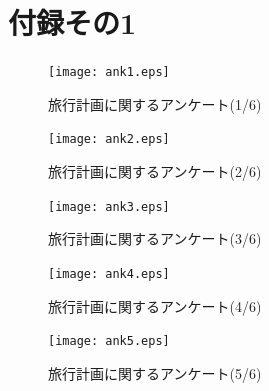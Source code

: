 \documentclass{funthesis}
\begin{document}


\chapter*{付録その1}

\begin{figure}[htpb]
\begin{center}
\texttt{[image: ank1.eps]}
\caption{旅行計画に関するアンケート(1/6)}
\end{center}
\end{figure}

\begin{figure}[htpb]
\begin{center}
\texttt{[image: ank2.eps]}
\caption{旅行計画に関するアンケート(2/6)}
\end{center}
\end{figure}

\begin{figure}[htpb]
\begin{center}
\texttt{[image: ank3.eps]}
\caption{旅行計画に関するアンケート(3/6)}
\end{center}
\end{figure}

\begin{figure}[htpb]
\begin{center}
\texttt{[image: ank4.eps]}
\caption{旅行計画に関するアンケート(4/6)}
\end{center}
\end{figure}

\begin{figure}[htpb]
\begin{center}
\texttt{[image: ank5.eps]}
\caption{旅行計画に関するアンケート(5/6)}
\end{center}
\end{figure}
\end{document}
